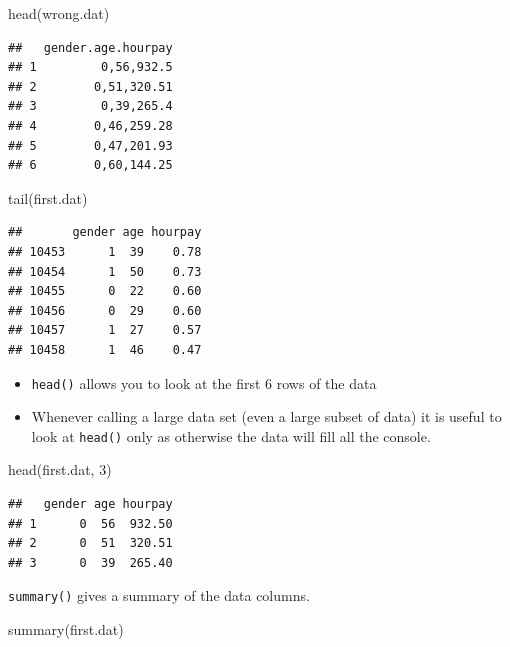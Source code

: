 \documentclass[
]{gitbook}
\newenvironment{Shaded}{\begin{snugshade}}{\end{snugshade}}
\newcommand{\DecValTok}[1]{\textcolor[rgb]{0.00,0.00,0.81}{#1}}
\newcommand{\FunctionTok}[1]{\textcolor[rgb]{0.00,0.00,0.00}{#1}}
\newcommand{\NormalTok}[1]{#1}
\providecommand{\tightlist}{%
  \setlength{\itemsep}{0pt}\setlength{\parskip}{0pt}}
\begin{document}
\begin{Shaded}
\begin{Highlighting}[]
\FunctionTok{head}\NormalTok{(wrong.dat)}
\end{Highlighting}
\end{Shaded}

\begin{verbatim}
##   gender.age.hourpay
## 1         0,56,932.5
## 2        0,51,320.51
## 3         0,39,265.4
## 4        0,46,259.28
## 5        0,47,201.93
## 6        0,60,144.25
\end{verbatim}

\footnotesize

\begin{Shaded}
\begin{Highlighting}[]
\FunctionTok{tail}\NormalTok{(first.dat)}
\end{Highlighting}
\end{Shaded}

\begin{verbatim}
##       gender age hourpay
## 10453      1  39    0.78
## 10454      1  50    0.73
## 10455      0  22    0.60
## 10456      0  29    0.60
## 10457      1  27    0.57
## 10458      1  46    0.47
\end{verbatim}

\begin{itemize}
\tightlist
\item
  \texttt{head()} allows you to look at the first 6 rows of the data
\item
  Whenever calling a large data set (even a large subset of data) it is useful to look at \texttt{head()} only as otherwise the data will fill all the console.
\end{itemize}

\begin{Shaded}
\begin{Highlighting}[]
\FunctionTok{head}\NormalTok{(first.dat, }\DecValTok{3}\NormalTok{)}
\end{Highlighting}
\end{Shaded}

\begin{verbatim}
##   gender age hourpay
## 1      0  56  932.50
## 2      0  51  320.51
## 3      0  39  265.40
\end{verbatim}

\footnotesize

\texttt{summary()} gives a summary of the data columns.

\begin{Shaded}
\begin{Highlighting}[]
\FunctionTok{summary}\NormalTok{(first.dat)}
\end{Highlighting}
\end{Shaded}
\end{document}
